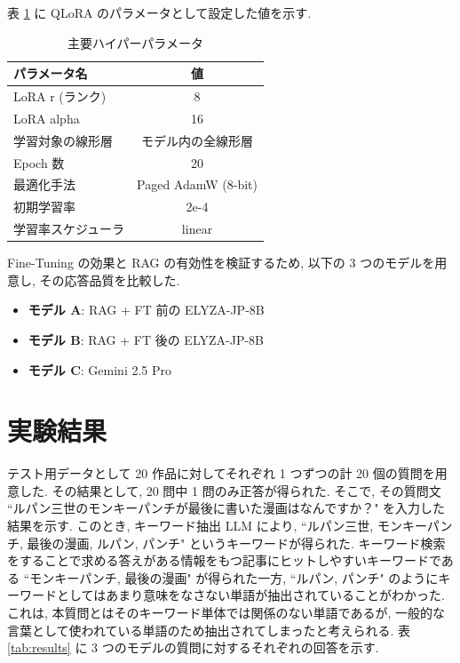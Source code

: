 \documentclass{jarticle}
\begin{document}
表 \ref{tab:sft_params} に QLoRA のパラメータとして設定した値を示す. \par

\begin{table}[t]
    \centering
    \caption{主要ハイパーパラメータ}
    \vspace{-3mm}
    \label{tab:sft_params}
    \begin{tabular}{|l|c|} \hline
        \textbf{パラメータ名} & \textbf{値} \\ \hline \hline
        LoRA r (ランク) & 8 \\ \hline
        LoRA alpha & 16 \\ \hline
        学習対象の線形層 & モデル内の全線形層 \\ \hline
        Epoch 数 & 20 \\ \hline
        最適化手法 & Paged AdamW (8-bit) \\ \hline
        初期学習率 & 2e-4 \\ \hline
        学習率スケジューラ & linear \\ \hline
    \end{tabular}
\end{table}

 Fine-Tuning の効果と RAG の有効性を検証するため, 以下の 3 つのモデルを用意し, その応答品質を比較した. 

\begin{itemize}
    \item \textbf{モデル A}: RAG + FT 前の ELYZA-JP-8B
    \item \textbf{モデル B}: RAG + FT 後の ELYZA-JP-8B 
    \item \textbf{モデル C}: Gemini 2.5 Pro
\end{itemize}

\vspace{-3mm}
\section{実験結果}
\vspace{-1mm}

テスト用データとして 20 作品に対してそれぞれ 1 つずつの計 20 個の質問を用意した. その結果として, 20 問中 1 問のみ正答が得られた. そこで, その質問文 ``ルパン三世のモンキーパンチが最後に書いた漫画はなんですか？" を入力した結果を示す. このとき, キーワード抽出 LLM により, ``ルパン三世, モンキーパンチ, 最後の漫画, ルパン, パンチ" というキーワードが得られた. キーワード検索をすることで求める答えがある情報をもつ記事にヒットしやすいキーワードである ``モンキーパンチ, 最後の漫画" が得られた一方, ``ルパン, パンチ" のようにキーワードとしてはあまり意味をなさない単語が抽出されていることがわかった. これは, 本質問とはそのキーワード単体では関係のない単語であるが, 一般的な言葉として使われている単語のため抽出されてしまったと考えられる. 表 \ref{tab:results} に 3 つのモデルの質問に対するそれぞれの回答を示す.
\end{document}
